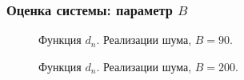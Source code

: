 \documentclass[pdf, 9pt,intlimits, unicode]{beamer}
\begin{document}
	\begin{frame}
		\frametitle{Оценка системы: параметр $ B $}
		\begin{figure}[!hhh]
			\caption{Функция $ d_n $. Реализации шума, $ B=90 $.}
			\label{pic:row_diff_small_B}
		\end{figure}
		
		\begin{figure}[!hhh]
			\caption{Функция $ d_n $. Реализации шума, $ B=200 $.}
			\label{pic:row_diff_big_B}
		\end{figure}
	\end{frame}
	
\end{document}
